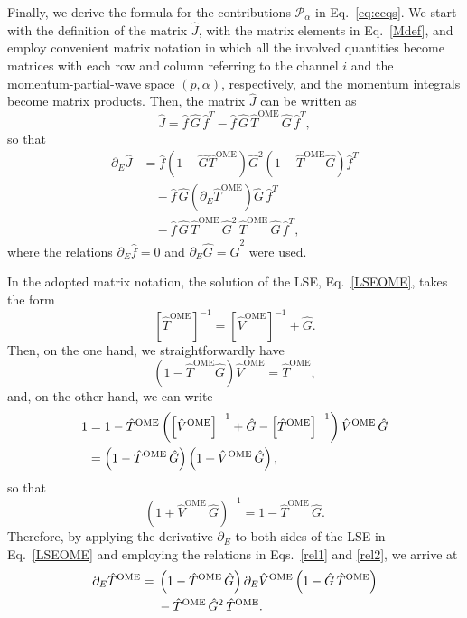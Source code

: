 \documentclass[aps,prd,showpacs,amsmath,twocolumn,superscriptaddress,floatfix,nofootinbib,notitlepage]{revtex4-2}
\newcommand{\be}{\begin{equation}}
\newcommand{\ee}{\end{equation}}
\begin{document}
Finally, we derive the formula for the contributions $\mathcal{P}_\alpha$ in Eq.~\eqref{eq:ceqs}.
We start with the definition of the matrix $\hat{J}$, with the matrix elements in Eq.~\eqref{Mdef}, and employ convenient matrix notation in which all the involved quantities become matrices with each row and column referring to the channel $i$ and the momentum-partial-wave space $(p, \alpha)$, respectively, and the momentum integrals become matrix products.
Then, the matrix $\hat{J}$ can be written as
\be
\hat{J}=\hat{f}\,\hat{G}\,\hat{f}^T - \hat{f}\,\hat{G}\,\hat{T}^{\mathrm{OME}}\,\hat{G}\,\hat{f}^T,
\ee
so that
\be
\begin{split}
\partial_E \hat{J} &=\hat{f}\left(1-\hat G\hat T^{\mathrm{OME}}\right) \hat{G}^2
\left(1-\hat{T}^{\mathrm{OME}}\hat{G}\right)\hat{f}^T \\
&\quad - \hat{f}\,\hat{G}\left(\partial_E \hat{T}^{\mathrm{OME}}\right)\hat{G}\,\hat{f}^T \\
&\quad
- \hat{f}\,\hat{G}\,\hat{T}^{\mathrm{OME}}\,\hat{G}^2\,
\hat{T}^{\mathrm{OME}}\,\hat{G}\,\hat{f}^T,
\end{split}
\label{Jprime}
\ee
where the relations $\partial_E\hat{f}=0$ and $\partial_E \hat{G}=\hat{G}^2$
were used. 

In the adopted matrix notation, the solution of the LSE, Eq.~\eqref{LSEOME}, takes the form
\be
\left[\hat{T}^{\mathrm{OME}}\right]^{-1}=
\left[\hat{V}^{\mathrm{OME}}\right]^{-1}+\hat{G}.
\ee
Then, on the one hand, we straightforwardly have
\be
\left(1-\hat{T}^{\mathrm{OME}}\hat{G}\right)\hat{V}^{\mathrm{OME}}=\hat{T}^{\mathrm{OME}},
\label{rel1}
\ee
and, on the other hand, we can write
\begin{align}
1&=1-\hat{T}^{\mathrm{OME}}\left(
\left[\hat{V}^{\mathrm{OME}}\right]^{-1}+\hat{G}-
\left[\hat{T}^{\mathrm{OME}}\right]^{-1}\right)\hat{V}^{\mathrm{OME}}\,\hat{G}\notag\\
&=\left(1-\hat{T}^{\mathrm{OME}}\,\hat{G}\right)\left(1+\hat{V}^{\mathrm{OME}}\,\hat{G}\right),
\end{align}
so that
\be
\left(1+\hat{V}^{\mathrm{OME}}\,\hat{G}\right)^{-1}=
1-\hat{T}^{\mathrm{OME}}\,\hat{G}.
\label{rel2}
\ee
Therefore, by applying the derivative $\partial_E$ to both sides of the LSE in Eq.~\eqref{LSEOME} and employing the relations in Eqs.~\eqref{rel1} and \eqref{rel2}, we arrive at
\begin{align}
\partial_E \hat{T}^{\mathrm{OME}} ={}& \left(1-\hat{T}^{\mathrm{OME}}\,\hat{G}\right)
\partial_E \hat{V}^{\mathrm{OME}} \left(1-\hat{G}\,\hat{T}^{\mathrm{OME}}\right)\notag\\
& -\hat{T}^{\mathrm{OME}}\,\hat{G}^2\,\hat{T}^{\mathrm{OME}}.\label{Tprime}
\end{align}
\end{document}
